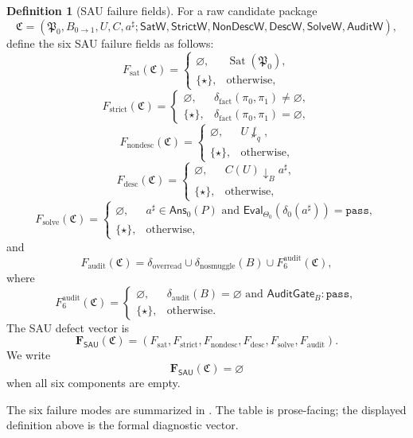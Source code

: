 \documentclass[11pt]{article}
\newcommand{\SAU}{\mathsf{SAU}}
\theoremstyle{definition}
\newtheorem{definition}[theorem]{Definition}
\begin{document}
\begin{definition}[SAU failure fields]
\label{def:sau-failure-fields}
For a raw candidate package
\[
\mathfrak C=(\mathfrak P_0,B_{0\to1},U,C,a^\sharp;
\mathsf{SatW},\mathsf{StrictW},\mathsf{NonDescW},\mathsf{DescW},\mathsf{SolveW},\mathsf{AuditW}),
\]
define the six SAU failure fields as follows:
\[
F_{\mathrm{sat}}(\mathfrak C)=
\begin{cases}
\varnothing,&\operatorname{Sat}(\mathfrak P_0),\\
\{\star\},&\text{otherwise},
\end{cases}
\]
\[
F_{\mathrm{strict}}(\mathfrak C)=
\begin{cases}
\varnothing,&\delta_{\mathrm{fact}}(\pi_0,\pi_1)\neq\varnothing,\\
\{\star\},&\delta_{\mathrm{fact}}(\pi_0,\pi_1)=\varnothing,
\end{cases}
\]
\[
F_{\mathrm{nondesc}}(\mathfrak C)=
\begin{cases}
\varnothing,&U\not\downarrow_q,\\
\{\star\},&\text{otherwise},
\end{cases}
\]
\[
F_{\mathrm{desc}}(\mathfrak C)=
\begin{cases}
\varnothing,&C(U)\downarrow_B a^\sharp,\\
\{\star\},&\text{otherwise},
\end{cases}
\]
\[
F_{\mathrm{solve}}(\mathfrak C)=
\begin{cases}
\varnothing,&a^\sharp\in\mathsf{Ans}_0(P)
\text{ and }\mathsf{Eval}_{\Theta_0}(\delta_0(a^\sharp))=\texttt{pass},\\
\{\star\},&\text{otherwise},
\end{cases}
\]
and
\[
F_{\mathrm{audit}}(\mathfrak C)=
\delta_{\mathrm{overread}}\cup \delta_{\mathrm{nosmuggle}}(B)
\cup F_{6}^{\mathrm{audit}}(\mathfrak C),
\]
where
\[
F_{6}^{\mathrm{audit}}(\mathfrak C)=
\begin{cases}
\varnothing,&\delta_{\mathrm{audit}}(B)=\varnothing
\text{ and }\mathsf{AuditGate}_B:\texttt{pass},\\
\{\star\},&\text{otherwise}.
\end{cases}
\]
The SAU defect vector is
\[
\mathbf F_{\SAU}(\mathfrak C)
=
(F_{\mathrm{sat}},F_{\mathrm{strict}},F_{\mathrm{nondesc}},
F_{\mathrm{desc}},F_{\mathrm{solve}},F_{\mathrm{audit}}).
\]
We write
\[
\mathbf F_{\SAU}(\mathfrak C)=\varnothing
\]
when all six components are empty.
\end{definition}

The six failure modes are summarized in .  The table is
prose-facing; the displayed definition above is the formal diagnostic vector.
\end{document}
